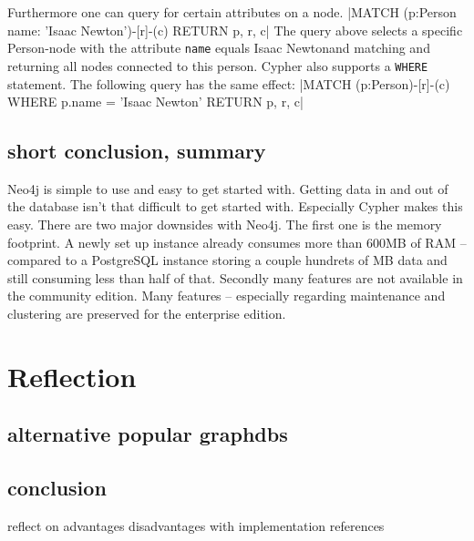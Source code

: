 Furthermore one can query for certain attributes on a node.
|MATCH (p:Person {name: 'Isaac Newton'})-[r]-(c) RETURN p, r, c|
The query above selects a specific Person-node with the attribute \texttt{name} equals \glqq Isaac Newton\grqq and matching and returning all nodes connected to this person.
Cypher also supports a \texttt{WHERE} statement. The following query has the same effect: |MATCH (p:Person)-[r]-(c) WHERE p.name = 'Isaac Newton' RETURN p, r, c|


\subsection{short conclusion, summary}
Neo4j is simple to use and easy to get started with.
Getting data in and out of the database isn't that difficult to get started with.
Especially Cypher makes this easy.
There are two major downsides with Neo4j. The first one is the memory footprint.
A newly set up instance already consumes more than 600MB of RAM -- compared to a PostgreSQL instance storing a couple hundrets of MB data and still consuming less than half of that.
Secondly many features are not available in the community edition.
Many features -- especially regarding maintenance and clustering are preserved for the enterprise edition.

\section{Reflection}
\subsection{alternative popular graphdbs}
\subsection{conclusion}
reflect on advantages disadvantages with implementation references
